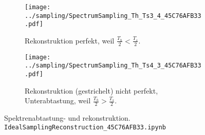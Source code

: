 \begin{figure*}[h]
\centering
\begin{subfigure}{0.75\textwidth}
\texttt{[image: ../sampling/SpectrumSampling\_Th\_Ts3\_4\_45C76AFB33.pdf]}
\caption{Rekonstruktion perfekt, weil $\frac{T_h}{2}<\frac{T_s}{2}$.}
\label{fig:SpectrumSampling_Th_Ts3_4_45C76AFB33}
\end{subfigure}

\begin{subfigure}{0.75\textwidth}
\texttt{[image: ../sampling/SpectrumSampling\_Th\_Ts4\_3\_45C76AFB33.pdf]}
\caption{Rekonstruktion (gestrichelt) nicht perfekt, Unterabtastung, weil $\frac{T_h}{2}>\frac{T_s}{2}$.}
\label{fig:SpectrumSampling_Th_Ts4_3_45C76AFB33}
\end{subfigure}
\caption{Spektrenabtastung- und rekonstruktion. \texttt{IdealSamplingReconstruction\_45C76AFB33.ipynb}}
\label{fig:SpectrumSampling_Th_TsXX45C76AFB33}
\end{figure*}
